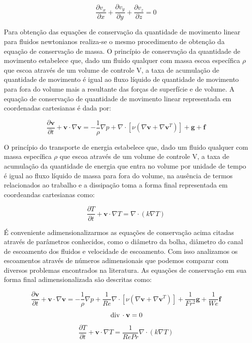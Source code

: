 \documentclass[a4paper,portuges,12pt]{article}
\newcommand{\diverg}{{\,\rm div}\,}
\newcommand{\vvet}{\mathbf{v}}
\begin{document}
\begin{equation}
	\frac{\partial v_x}{\partial x} +
	\frac{\partial v_y}{\partial y} +
	\frac{\partial v_z}{\partial z}  
	= 
	0
	\label{eq:cm9}
\end{equation}

Para obtenção das equações de conservação da quantidade de movimento
linear para fluidos newtonianos realiza-se o mesmo procedimento de
obtenção da equação de conservação de massa. O princípio de conservação
da quantidade de movimento estabelece que, dado um fluido qualquer com
massa escoa específica $\rho$ que escoa através de um volume de controle
V, a taxa de acumulação de quantidade de movimento é igual ao fluxo
líquido de quantidade de movimento para fora do volume mais a resultante
das forças de superfície e de volume. A equação de conservação de
quantidade de movimento linear representada em coordenadas cartesianas é
dada por:

\begin{equation}
	\frac{\partial \vvet}{\partial t} + \vvet \cdot \nabla \vvet
	= 
	- \frac{1}{\rho} \nabla p +
	\nabla \cdot [\nu(\nabla \vvet + \nabla \vvet^T)] + 
	\textbf{g} + 
	\textbf{f}
\label{eq:NS3a}
\end{equation}

O princípio do transporte de energia estabelece que, dado um
fluido qualquer com massa específica $\rho$ que escoa através de um
volume de controle V, a taxa de acumulação da quantidade de energia
que entra no volume por unidade de tempo é igual ao fluxo
líquido de massa para fora do volume, na ausência de termos relacionados
ao trabalho e a dissipação toma a forma final representada em
coordeandas cartesianas como:

\begin{equation}
	\frac{\partial T}{\partial t} + \vvet \cdot \nabla T
	=  
	\nabla \cdot (k \nabla T)
\label{eq:quimica2}
\end{equation}\vspace{0.5cm}

É conveniente adimensionalizarmos as equações de conservação acima
citadas através de parâmetros conhecidos, como o diâmetro da bolha,
diâmetro do canal de escoamento dos fluidos e velocidade de escoamento.
Com isso analizamos os escoamentos através de números adimensionais que
podemos comparar com diversos problemas encontrados na literatura. As
equações de conservação em sua forma final adimensionalizada são
descritas como:

\begin{equation}
	\frac{\partial \vvet}{\partial t} + \vvet \cdot \nabla \vvet
	=
	-\frac{1}{\rho} \nabla p + \frac{1}{Re} \nabla \cdot
	[\nu ( \nabla \vvet + \nabla \vvet^T)]+
	\frac{1}{Fr^2} \mathbf{g} + 
	\frac{1}{We} \mathbf{f}
	\label{eq:final1}
\end{equation}
\begin{equation}
	\diverg \cdot \vvet = 0
	\label{eq:final2} 
\end{equation}	
\begin{equation}
	\frac{\partial T}{\partial t} + \vvet \cdot \nabla T
	=
	\frac{1}{RePr} \nabla \cdot (k \nabla T)
	\label{eq:final3}
\end{equation}\vspace{0.5cm}
\end{document}
